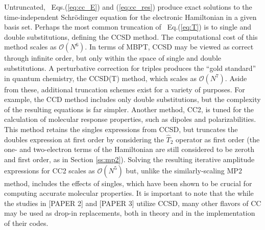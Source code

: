 Untruncated, ~Eqs.(\ref{eq:cc_E}) and (\ref{eq:cc_res}) produce exact solutions to the time-independent 
Schr\"odinger equation for the electronic Hamiltonian in a given basis set. Perhaps the most common 
truncation of ~Eq.(\ref{eq:T}) is to single and double substitutions, defining the CCSD method. 
The computational cost of this method scales as $\mathcal{O}(N^6)$. In terms of MBPT, CCSD may be viewed 
as correct through infinite order, but only within the space of single and double substitutions.
A perturbative correction for triples produces the ``gold standard'' in quantum chemistry, 
the CCSD(T) method, which scales as $\mathcal{O}(N^7)$. Aside from these, additional truncation schemes exist 
for a variety of purposes. For example, the CCD method includes only double substitutions, but the 
complexity of the resulting equations is far simpler. Another method, CC2, is tuned for the calculation
of molecular response properties, such as dipoles and polarizabilities. This method retains the singles
expressions from CCSD, but truncates the doubles expression at first order by considering the $\hat{T}_2$ 
operator as first order (the one- and two-electron terms of the Hamiltonian are still considered to be
zeroth and first order, as in Section \ref{ss:mp2}). Solving the resulting iterative amplitude expressions 
for CC2
scales as $\mathcal{O}(N^5)$ but, unlike the similarly-scaling MP2 method, includes the effects of singles, 
which have been shown to be crucial for computing accurate molecular properties. 
It is important to note that the while the studies in [PAPER 2] and [PAPER 3] utilize CCSD, 
many other flavors of CC may be used as drop-in replacements, both in theory and in the implementation 
of their codes. 

